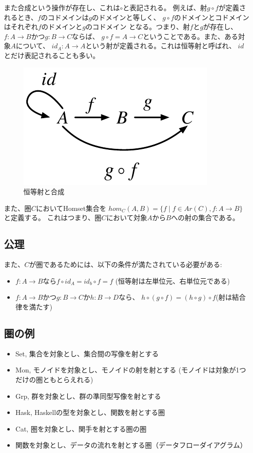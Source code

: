 \documentclass{jsarticle}
\begin{document}
また合成という操作が存在し、これは$\circ$と表記される。
例えば、射$g \circ f$が定義されるとき、$f$のコドメインは$g$のドメインと等しく、
$g \circ f$のドメインとコドメインはそれぞれ$f$のドメインと$g$のコドメイン
となる。つまり、射$f$と$g$が存在し、$f:A \to B$かつ$g:B \to C$ならば、
$g \circ f = A \to C$ということである。また、ある対象$A$について、
$id_A: A \to A$という射が定義される。これは恒等射と呼ばれ、
$id$とだけ表記されることも多い。

\begin{figure}[htbp]
    \centering
    \includegraphics{diag_comp.pdf}
    \caption{恒等射と合成}
\end{figure}

また、圏$C$においてHomset集合を
$hom_C(A,B)=\{f \mid f \in Ar(C), f: A \to B\}$と定義する。
これはつまり、圏$C$において対象$A$から$B$への射の集合である。

\subsection{公理}
また、$C$が圏であるためには、以下の条件が満たされている必要がある:
\begin{itemize}
    \item $f:A \to B$なら$f \circ id_A = id_b \circ f = f$
        (恒等射は左単位元、右単位元である)
    \item $f:A \to B$かつ$g: B \to C$か$h: B \to D$なら、
        $h \circ (g \circ f)=(h\circ g) \circ f$(射は結合律を満たす)
\end{itemize}

\subsection{圏の例}
\begin{itemize}
    \item Set, 集合を対象とし、集合間の写像を射とする
    \item Mon, モノイドを対象とし、モノイドの射を射とする
        (モノイドは対象が1つだけの圏ともとらえれる)
    \item Grp, 群を対象とし、群の準同型写像を射とする
    \item Hask, Haskellの型を対象とし、関数を射とする圏
    \item Cat, 圏を対象とし、関手を射とする圏の圏
    \item 関数を対象とし、データの流れを射とする圏（データフローダイアグラム）
\end{itemize}
\end{document}
